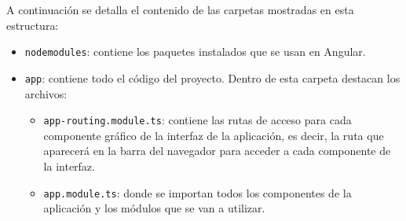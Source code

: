 A continuación se detalla el contenido de las carpetas mostradas en esta estructura:

\begin{itemize}
    \item \texttt{nodemodules}: contiene los paquetes instalados que se usan en Angular.
    \item \texttt{app}: contiene todo el código del proyecto. Dentro de esta carpeta destacan los archivos:
    \begin{itemize}
        \item \texttt{app-routing.module.ts}: contiene las rutas de acceso para cada componente gráfico de la interfaz de la aplicación, es decir, la ruta que aparecerá en la barra del navegador para acceder a cada componente de la interfaz.
        \item \texttt{app.module.ts}: donde se importan todos los componentes de la aplicación y los módulos que se van a utilizar.
    \end{itemize}
\end{itemize}


